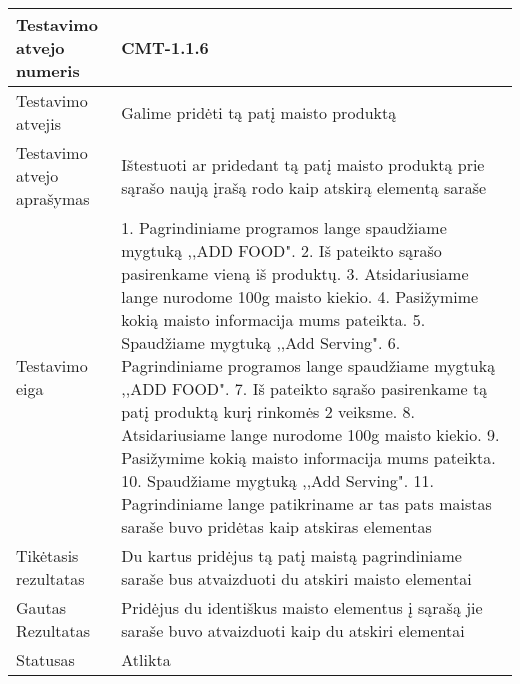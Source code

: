 \documentclass[oneside]{VUMIFPSkursinis}
\begin{document}
\begin{center}
    \begin{tabular}{ |p{5cm}|p{13cm}|}
    \hline
        Testavimo atvejo numeris &  CMT-1.1.6\\ \hline
        Testavimo atvejis & Galime pridėti tą patį maisto produktą  \\ \hline
        Testavimo atvejo aprašymas & Ištestuoti ar pridedant tą patį maisto produktą prie sąrašo naują įrašą rodo kaip atskirą elementą saraše  \\ \hline
        Testavimo eiga &  1. Pagrindiniame programos lange spaudžiame mygtuką ,,ADD FOOD". 
				2. Iš pateikto sąrašo pasirenkame vieną iš produktų. 
				3. Atsidariusiame lange nurodome 100g maisto kiekio.
				4. Pasižymime kokią maisto informacija mums pateikta. 
				5. Spaudžiame mygtuką ,,Add Serving".
				6. Pagrindiniame programos lange spaudžiame mygtuką ,,ADD FOOD".
				7. Iš pateikto sąrašo pasirenkame tą patį produktą kurį rinkomės 2 veiksme.
				8. Atsidariusiame lange nurodome 100g maisto kiekio.
				9. Pasižymime kokią maisto informacija mums pateikta.
				10. Spaudžiame mygtuką ,,Add Serving".
				11. Pagrindiniame lange patikriname ar tas pats maistas saraše buvo pridėtas kaip atskiras elementas 
			\\ \hline
        Tikėtasis rezultatas &  Du kartus pridėjus tą patį maistą pagrindiniame saraše bus atvaizduoti du atskiri maisto elementai\\ \hline
        Gautas Rezultatas &  Pridėjus du identiškus maisto elementus į sąrašą jie saraše buvo atvaizduoti kaip du atskiri elementai\\ \hline
        Statusas & Atlikta \\ \hline
    \hline
    \end{tabular}
\end{center}
\end{document}
